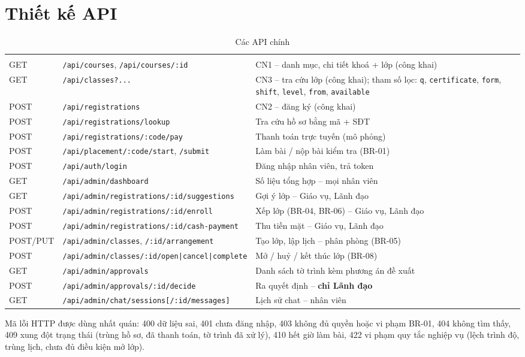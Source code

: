 \section{Thiết kế API}
\begin{xltabular}{\linewidth}{|l|L{6.3cm}|Y|}
  \caption{Các API chính}\label{tab:api}\\ \hline
  \headrow {} &  &  \\ \hline
  \endfirsthead \hline
  \headrow {} &  &  \\ \hline
  \endhead
  GET & \texttt{/api/courses}, \texttt{/api/courses/:id} & CN1 – danh mục, chi tiết khoá + lớp (công khai) \\ \hline
  GET & \texttt{/api/classes?...} & CN3 – tra cứu lớp (công khai); tham số lọc: \texttt{q}, \texttt{certificate}, \texttt{form}, \texttt{shift}, \texttt{level}, \texttt{from}, \texttt{available} \\ \hline
  POST & \texttt{/api/registrations} & CN2 – đăng ký (công khai) \\ \hline
  POST & \texttt{/api/registrations/lookup} & Tra cứu hồ sơ bằng mã + SĐT \\ \hline
  POST & \texttt{/api/registrations/:code/pay} & Thanh toán trực tuyến (mô phỏng) \\ \hline
  POST & \texttt{/api/placement/:code/start}, \texttt{/submit} & Làm bài / nộp bài kiểm tra (BR-01) \\ \hline
  POST & \texttt{/api/auth/login} & Đăng nhập nhân viên, trả token \\ \hline
  GET & \texttt{/api/admin/dashboard} & Số liệu tổng hợp – mọi nhân viên \\ \hline
  GET & \texttt{/api/admin/registrations/:id/suggestions} & Gợi ý lớp – Giáo vụ, Lãnh đạo \\ \hline
  POST & \texttt{/api/admin/registrations/:id/enroll} & Xếp lớp (BR-04, BR-06) – Giáo vụ, Lãnh đạo \\ \hline
  POST & \texttt{/api/admin/registrations/:id/cash-payment} & Thu tiền mặt – Giáo vụ, Lãnh đạo \\ \hline
  POST/PUT & \texttt{/api/admin/classes}, \texttt{/:id/arrangement} & Tạo lớp, lập lịch – phân phòng (BR-05) \\ \hline
  POST & \texttt{/api/admin/classes/:id/open|cancel|complete} & Mở / huỷ / kết thúc lớp (BR-08) \\ \hline
  GET & \texttt{/api/admin/approvals} & Danh sách tờ trình kèm phương án đề xuất \\ \hline
  POST & \texttt{/api/admin/approvals/:id/decide} & Ra quyết định – \textbf{chỉ Lãnh đạo} \\ \hline
  GET & \texttt{/api/admin/chat/sessions[/:id/messages]} & Lịch sử chat – nhân viên \\ \hline
\end{xltabular}
Mã lỗi HTTP được dùng nhất quán: 400 dữ liệu sai, 401 chưa đăng nhập, 403 không đủ quyền hoặc vi phạm BR-01, 404 không tìm thấy, 409 xung đột trạng thái (trùng hồ sơ, đã thanh toán, tờ trình đã xử lý), 410 hết giờ làm bài, 422 vi phạm quy tắc nghiệp vụ (lệch trình độ, trùng lịch, chưa đủ điều kiện mở lớp).

